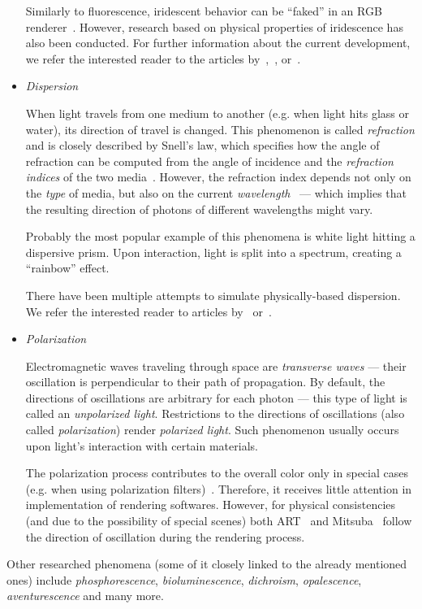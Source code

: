 \begin{itemize}
Similarly to fluorescence, iridescent behavior can be ``faked'' in an RGB renderer~\cite{iridescenceRGB}. However, research based on physical properties of iridescence has also been conducted. For further information about the current development, we refer the interested reader to the articles by~\citet{iridescenceArticle1},~\citet{iridescenceArticle2}, or~\citet{iridescenceArticle3}.

\item \emph{Dispersion}

When light travels from one medium to another (e.g. when light hits glass or water), its direction of travel is changed. This phenomenon is called \emph{refraction} and is closely described by Snell's law, which specifies how the angle of refraction can be computed from the angle of incidence and the \emph{refraction indices} of the two media~\cite{snellsLaw}. However, the refraction index depends not only on the \emph{type} of media, but also on the current \emph{wavelength}~\cite{dispersionRendering1} --- which implies that the resulting direction of photons of different wavelengths might vary.

Probably the most popular example of this phenomena is white light hitting a dispersive prism. Upon interaction, light is split into a spectrum, creating a ``rainbow'' effect.

There have been multiple attempts to simulate physically-based dispersion. We refer the interested reader to articles by~\citet{dispersionRendering1} or~\citet{dispersionRendering2}.

\item \emph{Polarization}

Electromagnetic waves traveling through space are \emph{transverse waves} --- their oscillation is perpendicular to their path of propagation. By default, the directions of oscillations are arbitrary for each photon --- this type of light is called an \emph{unpolarized light}. Restrictions to the directions of oscillations (also called \emph{polarization}) render \emph{polarized light}. Such phenomenon usually occurs upon light's interaction with certain materials.

The polarization process contributes to the overall color only in special cases (e.g. when using polarization filters)~\cite{fluorescencePolarization}. Therefore, it receives little attention in implementation of rendering softwares. However, for physical consistencies (and due to the possibility of special scenes) both ART~\cite{ART} and Mitsuba~\cite{Mitsuba2} follow the direction of oscillation during the rendering process.
\end{itemize}

Other researched phenomena (some of it closely linked to the already mentioned ones) include \emph{phosphorescence}, \emph{bioluminescence}, \emph{dichroism}, \emph{opalescence}, \emph{aventurescence} and many more.

